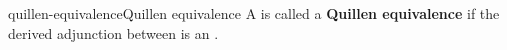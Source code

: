 \begin{topic}{quillen-equivalence}{Quillen equivalence}
    A  is called a \textbf{Quillen equivalence} if the derived adjunction between  is an .
\end{topic}

    

